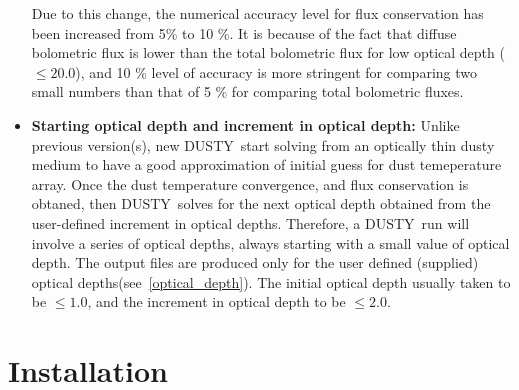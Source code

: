 \documentclass[11pt]{article}
\def\D  {{\sf DUSTY}}
\begin{document}
\begin{itemize}
Due to this change, the numerical accuracy level for flux conservation has been increased from
5\% to 10 \%. It is because of the fact that diffuse bolometric flux is lower than the total 
bolometric flux for low optical depth ($\le 20.0$), and 10 \% level of accuracy is more 
stringent for comparing two small numbers than that of 5 \% for comparing total bolometric 
fluxes.
%
\item
{\bf Starting optical depth and increment in optical depth:} Unlike previous version(s), new 
\D\ start solving from an optically thin dusty medium to have a good approximation of initial 
guess for dust temeperature array. Once the dust temperature convergence, and flux conservation 
is obtaned, then \D\ solves for the next optical depth obtained from the user-defined 
increment in optical depths. Therefore, a \D\ run will involve a series of optical depths, 
always starting with a small value of optical depth. The output files are produced only for the 
user defined (supplied) optical depths(see~\ref{optical_depth}). The initial optical depth 
usually taken to be $\le 1.0$, and the increment in optical depth to be $\le 2.0$.
\end{itemize}


\section{Installation}
\label{installation}
\end{document}
